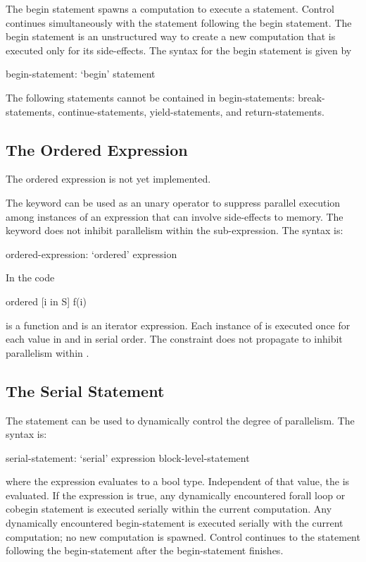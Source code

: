 The begin statement spawns a computation to execute a statement.
Control continues simultaneously with the statement following the
begin statement. The begin statement is an unstructured way to create
a new computation that is executed only for its side-effects. The
syntax for the begin statement is given by
\begin{syntax}
begin-statement:
  `begin' statement
\end{syntax}

The following statements cannot be contained in begin-statements:
break-statements, continue-statements, yield-statements, and
return-statements.

\subsection{The Ordered Expression}
\label{Ordered_Expressions}

\begin{status}
The ordered expression is not yet implemented.
\end{status}

The  keyword can be used as an unary operator to suppress
parallel execution among instances of an expression that can involve
side-effects to memory.  The  keyword does not inhibit
parallelism within the sub-expression.  The syntax is:
\begin{syntax}
ordered-expression:
   `ordered' expression
\end{syntax}

\begin{example}
In the code
\begin{chapel}
ordered [i in S] f(i) 
\end{chapel}
 is a function and  is an iterator expression. Each
instance of  is executed once for each value in 
and in serial order. The  constraint does not propagate
to inhibit parallelism within .
\end{example}

\subsection{The Serial Statement}
\label{Serial}

The  statement can be used to dynamically control the
degree of parallelism.  The syntax is:
\begin{syntax}
serial-statement:
  `serial' expression block-level-statement
\end{syntax}
where the expression evaluates to a bool type.  Independent of that
value, the  is evaluated. If the
expression is true, any dynamically encountered forall loop or cobegin
statement is executed serially within the current computation.  Any
dynamically encountered begin-statement is executed serially with the
current computation; no new computation is spawned.  Control continues
to the statement following the begin-statement after the
begin-statement finishes.

